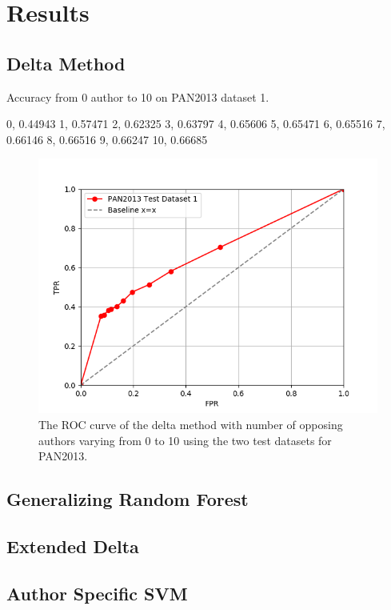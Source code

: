 \section{Results}

\subsection{Delta Method}

Accuracy from 0 author to 10 on PAN2013 dataset 1.

0, 0.44943
1, 0.57471
2, 0.62325
3, 0.63797
4, 0.65606
5, 0.65471
6, 0.65516
7, 0.66146
8, 0.66516
9, 0.66247
10, 0.66685

\begin{figure}
    \centering
    \includegraphics[width=.7\textwidth]{./pictures/delta_method_roc.png}
    \caption{The ROC curve of the delta method with number of opposing authors
    varying from 0 to 10 using the two test datasets for PAN2013.}
    \label{fig:delta_method_roc}
\end{figure}

\subsection{Generalizing Random Forest}

\subsection{Extended Delta}

\subsection{Author Specific SVM}

